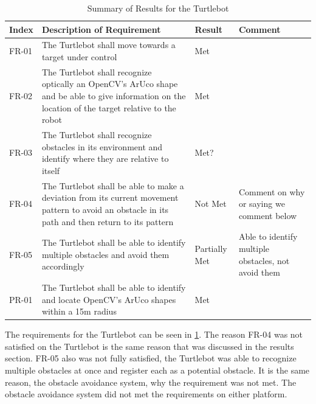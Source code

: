 \documentclass{article}
\begin{document}
	\begin{table}
	    \small
		\begin{tabular}{p{2cm} p{8cm} p{2cm} p{3cm}} 
			\hline
			{\textbf{Index}} & {\textbf{Description of Requirement}} & {\textbf{Result}} & {\textbf{Comment}} \\ \hline
FR-01 & The Turtlebot shall move towards a target under control & Met \\
FR-02 & The Turtlebot shall recognize optically an OpenCV's ArUco shape and be able to give information on the location of the target relative to the robot & Met \\
FR-03 & The Turtlebot shall recognize obstacles in its environment and identify where they are relative to itself & Met? \\
FR-04 & The Turtlebot shall be able to make a deviation from its current movement pattern to avoid an obstacle in its path and then return to its pattern & Not Met & Comment on why or saying we comment below \\
FR-05 & The Turtlebot shall be able to identify multiple obstacles and avoid them accordingly & Partially Met & Able to identify multiple obstacles, not avoid them \\
PR-01 & The Turtlebot shall be able to identify and locate OpenCV's ArUco shapes within a 15m radius & Met \\ \hline
        \end{tabular}
        \caption{Summary of Results for the Turtlebot}
        \label{table:turtlbotresults}
    \end{table}

    The requirements for the Turtlebot can be seen in \ref{table:turtlbotresults}. The reason FR-04 was not satisfied on the Turtlebot is the same reason that was discussed in the results section. FR-05 also was not fully satisfied, the Turtlebot was able to recognize multiple obstacles at once and register each as a potential obstacle. It is the same reason, the obstacle avoidance system, why the requirement was not met. 
    The obstacle avoidance system did not met the requirements on either platform.  
\end{document}
